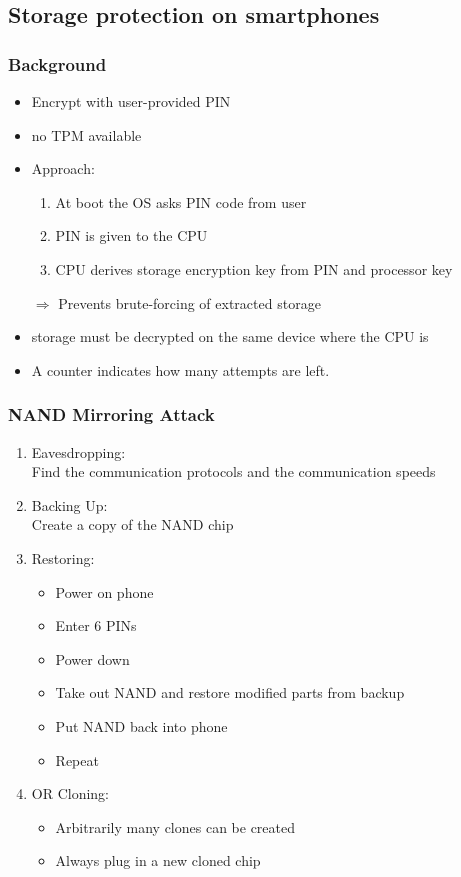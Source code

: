 \subsection{Storage protection on smartphones}
\subsubsection{Background}
\begin{itemize}
  \item Encrypt with user-provided PIN
  \item no TPM available
  \item Approach:
    \begin{enumerate}
      \item At boot the OS asks PIN code from user
      \item PIN is given to the CPU
      \item CPU derives storage encryption key from PIN and processor key
    \end{enumerate}
    $\Rightarrow$ Prevents brute-forcing of extracted storage
  \item storage must be decrypted on the same device where the CPU is
  \item A counter indicates how many attempts are left.
\end{itemize}

\subsubsection{NAND Mirroring Attack}
\begin{enumerate}
  \item  Eavesdropping:\\
    Find the communication protocols and the communication speeds
  \item Backing Up:\\
    Create a copy of the NAND chip
  \item Restoring:
    \begin{itemize}
      \item Power on phone
      \item Enter 6 PINs
      \item Power down
      \item Take out NAND and restore modified parts from backup
      \item Put NAND back into phone
      \item Repeat
    \end{itemize}
  \item OR Cloning:
    \begin{itemize}
      \item Arbitrarily many clones can be created
      \item Always plug in a new cloned chip
    \end{itemize}
\end{enumerate}
